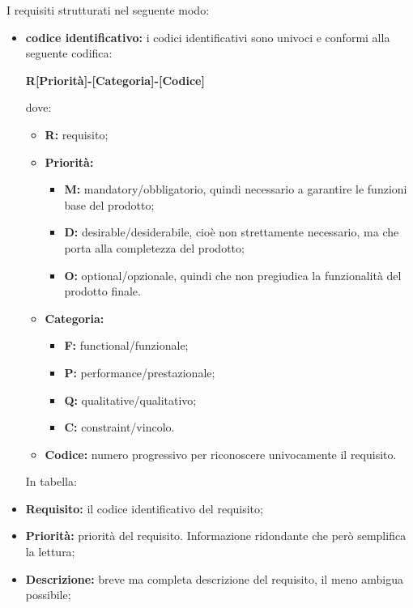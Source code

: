 
I requisiti strutturati nel seguente modo:

\begin{itemize}
	
	\item \textbf{codice identificativo:} i codici identificativi sono univoci e conformi alla seguente codifica:
	\begin{center}
		\textbf{R[Priorità]-[Categoria]-[Codice]}
	\end{center}
	dove: 
		\begin{itemize}
			\item \textbf{R:} requisito;
			\item \textbf{Priorità:}
			\begin{itemize}
				\item \textbf{M:} mandatory/obbligatorio, quindi necessario a garantire le funzioni base del prodotto;
				\item \textbf{D:} desirable/desiderabile, cioè non strettamente necessario, ma che porta alla completezza del prodotto;
				\item \textbf{O:} optional/opzionale, quindi che non pregiudica la funzionalità del prodotto finale.
			\end{itemize}
			\item \textbf{Categoria:}
			\begin{itemize}
				\item \textbf{F:} functional/funzionale;
				\item \textbf{P:} performance/prestazionale;
				\item \textbf{Q:} qualitative/qualitativo;
				\item \textbf{C:} constraint/vincolo.
			\end{itemize}
			\item \textbf{Codice:} numero progressivo per riconoscere univocamente il requisito. \\
		\end{itemize}
	\noindent In tabella:
	\item \textbf{Requisito:} il codice identificativo del  requisito;
	\item \textbf{Priorità:} priorità del requisito. Informazione ridondante che però semplifica la lettura;
	
	\item \textbf{Descrizione:} breve ma completa descrizione del requisito, il meno ambigua possibile;
	

\end{itemize}

